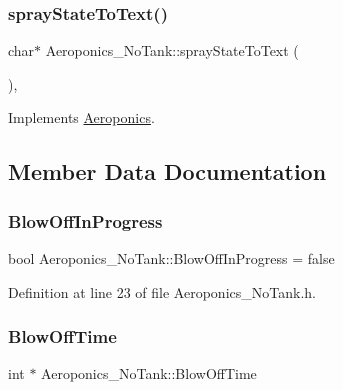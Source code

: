 \subsubsection{\texorpdfstring{spray\+State\+To\+Text()}{sprayStateToText()}\hspace{0.1cm}{\footnotesize\ttfamily [2/2]}}
{\footnotesize\ttfamily char$\ast$ Aeroponics\+\_\+\+No\+Tank\+::spray\+State\+To\+Text (\begin{DoxyParamCaption}{ }\end{DoxyParamCaption})\hspace{0.3cm}{\ttfamily [protected]}, {\ttfamily [virtual]}}



Implements \hyperlink{class_aeroponics_aa79435aaa49a563d41ae092ec3e87e06}{Aeroponics}.



\subsection{Member Data Documentation}
\mbox{\label{class_aeroponics___no_tank_a32cb324acd8979937da5fed0ba41415e}} 
\subsubsection{\texorpdfstring{Blow\+Off\+In\+Progress}{BlowOffInProgress}}
{\footnotesize\ttfamily bool Aeroponics\+\_\+\+No\+Tank\+::\+Blow\+Off\+In\+Progress = false\hspace{0.3cm}{\ttfamily [protected]}}



Definition at line 23 of file Aeroponics\+\_\+\+No\+Tank.\+h.

\mbox{\label{class_aeroponics___no_tank_a6e28c700e8f725f25c978d071dec9d70}} 
\subsubsection{\texorpdfstring{Blow\+Off\+Time}{BlowOffTime}}
{\footnotesize\ttfamily int $\ast$ Aeroponics\+\_\+\+No\+Tank\+::\+Blow\+Off\+Time\hspace{0.3cm}{\ttfamily [protected]}}



